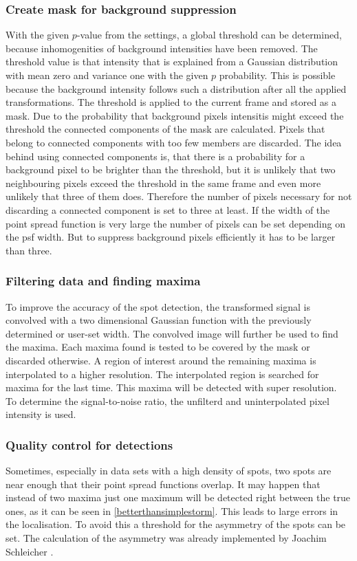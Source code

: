 \subsubsection{Create mask for background suppression}
With the given $p$-value from the settings, a global threshold can be determined, because inhomogenities of background intensities have been removed. The threshold value is that intensity that is explained from a Gaussian distribution with mean zero and variance one with the given $p$ probability. This is possible because the background intensity follows such a distribution after all the applied transformations.\newline
The threshold is applied to the current frame and stored as a mask. Due to the probability that background pixels intensitis might exceed the threshold the connected components of the mask are calculated. Pixels that belong to connected components with too few members are discarded. The idea behind using connected components is, that there is a probability for a background pixel to be brighter than the threshold, but it is unlikely that two neighbouring pixels exceed the threshold in the same frame and even more unlikely that three of them does. Therefore the number of pixels necessary for not discarding a connected component is set to three at least. If the width of the point spread function is very large the number of pixels can be set depending on the psf width. But to suppress background pixels efficiently it has to be larger than three.
\subsubsection{Filtering data and finding maxima}
To improve the accuracy of the spot detection, the transformed signal is convolved with a two dimensional Gaussian function with the previously determined or user-set width. The convolved image will further be used to find the maxima. Each maxima found is tested to be covered by the mask or discarded otherwise. A region of interest around the remaining maxima is interpolated to a higher resolution. The interpolated region is searched for maxima for the last time. This maxima will be detected with super resolution.\\
To determine the signal-to-noise ratio, the unfilterd and uninterpolated pixel intensity is used.

\subsubsection{Quality control for detections}
Sometimes, especially in data sets with a high density of spots, two spots are near enough that their point spread functions overlap. It may happen that instead of two maxima just one maximum will be detected right between the true ones, as it can be seen in \ref{betterthansimplestorm}. This leads to large errors in the localisation. To avoid this a threshold for the asymmetry of the spots can be set.\newline
The calculation of the asymmetry was already implemented by Joachim Schleicher \cite{MAJoachim}.


